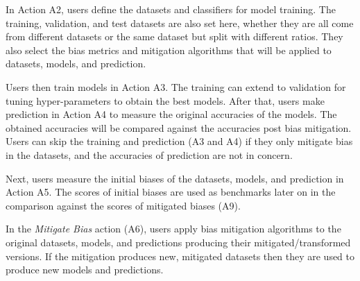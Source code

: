\documentclass[final,5p,times,twocolumn]{elsarticle}
\begin{document}
In Action A2, users define the datasets and classifiers for model training. The training, validation, and test datasets are also set here, whether they are all come from different datasets or the same dataset but split with different ratios. They also select the bias metrics and mitigation algorithms that will be applied to datasets, models, and prediction. 

Users then train models in Action A3. The training can extend to validation for tuning hyper-parameters to obtain the best models. After that, users make prediction in Action A4 to measure the original accuracies of the models. The obtained accuracies will be compared against the accuracies post bias mitigation.
Users can skip the training and prediction (A3 and A4) if they only mitigate bias in the datasets, and the accuracies of prediction are not in concern.

Next, users measure the initial biases of the datasets, models, and prediction in Action A5. The scores of initial biases are used as benchmarks later on in the comparison against the scores of mitigated biases (A9). 

In the \textit{Mitigate Bias} action (A6), users apply bias mitigation algorithms to the original datasets, models, and predictions producing their mitigated/transformed versions. If the mitigation produces new, mitigated datasets then they are used to produce new models and predictions. 


%
\end{document}
